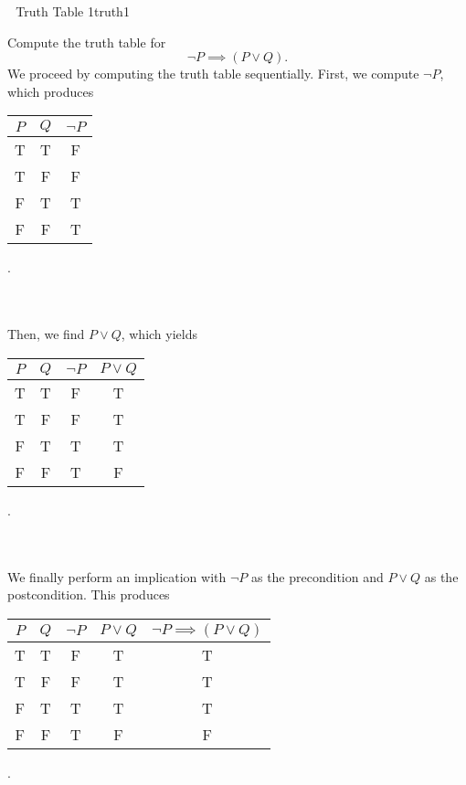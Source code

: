         \begin{example}{\Difficulty\,\Difficulty\,\Difficulty\,\,Truth Table 1}{truth1}
        
            Compute the truth table for
            \begin{equation*}
                \neg P\implies (P\vee Q).
            \end{equation*}
            We proceed by computing the truth table sequentially.
            First, we compute \(\neg P\), which produces
            \begin{center}
                \begin{tabular}{c|c|c}
                    \hline
                    \(P\) & \(Q\) & \(\neg P\) \\
                    \hline
                    T & T & F \\
                    T & F & F \\
                    F & T & T \\
                    F & F & T \\
                    \hline
                \end{tabular}.
            \end{center}
            \vphantom
            \\
            \\
            Then, we find \(P \vee Q\), which yields
            \begin{center}
                \begin{tabular}{c|c|c|c}
                    \hline
                    \(P\) & \(Q\) & \(\neg P\) & \(P\vee Q\) \\
                    \hline
                    T & T & F & T \\
                    T & F & F & T \\
                    F & T & T & T \\
                    F & F & T & F \\
                    \hline
                \end{tabular}.
            \end{center}
            \vphantom
            \\
            \\
            We finally perform an implication with \(\neg P\) as the precondition and \(P\vee Q\) as the postcondition. This produces
            \begin{center}
                \begin{tabular}{c|c|c|c|c}
                    \hline
                    \(P\) & \(Q\) & \(\neg P\) & \(P\vee Q\) & \(\neg P\implies (P\vee Q)\) \\
                    \hline
                    T & T & F & T & T \\
                    T & F & F & T & T \\
                    F & T & T & T & T \\
                    F & F & T & F & F \\
                    \hline
                \end{tabular}.
            \end{center}
        

\end{example}
